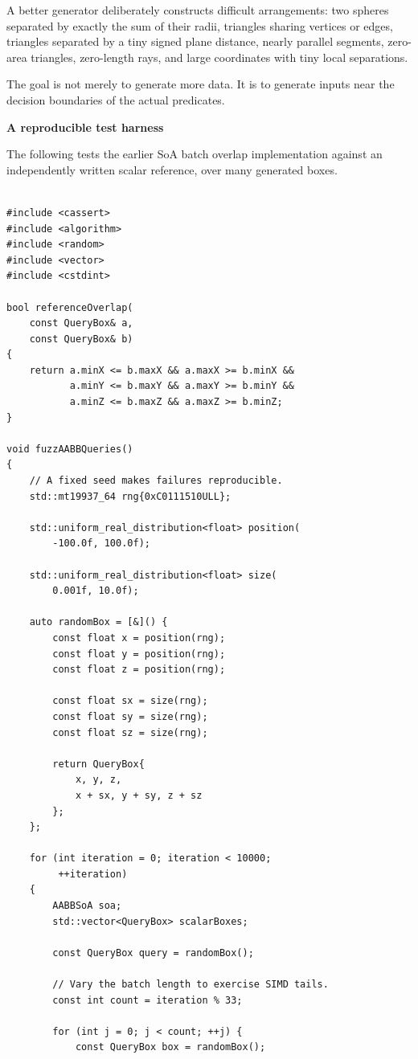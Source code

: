 A better generator deliberately constructs difficult arrangements: two spheres separated by exactly the sum of their radii, triangles sharing vertices or edges, triangles separated by a tiny signed plane distance, nearly parallel segments, zero-area triangles, zero-length rays, and large coordinates with tiny local separations.

The goal is not merely to generate more data. It is to generate inputs near the decision boundaries of the actual predicates.

\textbf{A reproducible test harness}

The following tests the earlier SoA batch overlap implementation against an independently written scalar reference, over many generated boxes.

\begin{verbatim}

#include <cassert>
#include <algorithm>
#include <random>
#include <vector>
#include <cstdint>

bool referenceOverlap(
    const QueryBox& a,
    const QueryBox& b)
{
    return a.minX <= b.maxX && a.maxX >= b.minX &&
           a.minY <= b.maxY && a.maxY >= b.minY &&
           a.minZ <= b.maxZ && a.maxZ >= b.minZ;
}

void fuzzAABBQueries()
{
    // A fixed seed makes failures reproducible.
    std::mt19937_64 rng{0xC0111510ULL};

    std::uniform_real_distribution<float> position(
        -100.0f, 100.0f);

    std::uniform_real_distribution<float> size(
        0.001f, 10.0f);

    auto randomBox = [&]() {
        const float x = position(rng);
        const float y = position(rng);
        const float z = position(rng);

        const float sx = size(rng);
        const float sy = size(rng);
        const float sz = size(rng);

        return QueryBox{
            x, y, z,
            x + sx, y + sy, z + sz
        };
    };

    for (int iteration = 0; iteration < 10000;
         ++iteration)
    {
        AABBSoA soa;
        std::vector<QueryBox> scalarBoxes;

        const QueryBox query = randomBox();

        // Vary the batch length to exercise SIMD tails.
        const int count = iteration % 33;

        for (int j = 0; j < count; ++j) {
            const QueryBox box = randomBox();


\end{verbatim}
